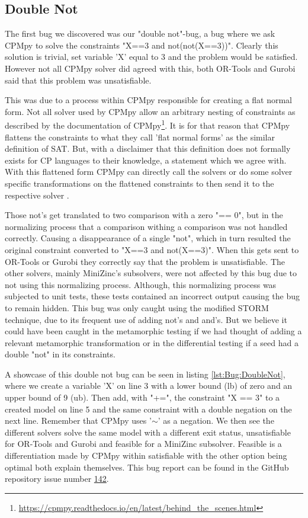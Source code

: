 \subsection{Double Not}
\label{res:bug:DoubleNot}
The first bug we discovered was our "double not"-bug, a bug where we ask CPMpy to solve the constraints "X==3 and not(not(X==3))". Clearly this solution is trivial, set variable 'X' equal to 3 and the problem would be satisfied. However not all CPMpy solver did agreed with this, both OR-Tools and Gurobi said that this problem was unsatisfiable. 

This was due to a process within CPMpy responsible for creating a flat normal form. Not all solver used by CPMpy allow an arbitrary nesting of constraints as described by the documentation of CPMpy\footnote{\url{https://cpmpy.readthedocs.io/en/latest/behind_the_scenes.html}}. It is for that reason that CPMpy flattens the constraints to what they call 'flat normal forms' as the similar definition of SAT. But, with a disclaimer that this definition does not formally exists for CP languages to their knowledge, a statement which we agree with. With this flattened form CPMpy can directly call the solvers or do some solver specific transformations on the flattened constraints to then send it to the respective solver \cite{CPMpyGithub}. 

Those not's get translated to two comparison with a zero "== 0", but in the normalizing process that a comparison withing a comparison was not handled correctly. Causing a disappearance of a single "not", which in turn resulted the original constraint converted to "X==3 and not(X==3)". When this gets sent to OR-Tools or Gurobi they correctly say that the problem is unsatisfiable. The other solvers, mainly MiniZinc's subsolvers, were not affected by this bug due to not using this normalizing process. Although, this normalizing process was subjected to unit tests, these tests contained an incorrect output causing the bug to remain hidden. This bug was only caught using the modified STORM technique, due to its frequent use of adding not's and and's. But we believe it could have been caught in the metamorphic testing if we had thought of adding a relevant metamorphic transformation or in the differential testing if a seed had a double "not" in its constraints. 

A showcase of this double not bug can be seen in listing \ref{lst:Bug:DoubleNot}, where we create a variable 'X' on line 3 with a lower bound (lb) of zero and an upper bound of 9 (ub). Then add, with "+=", the constraint "X == 3" to a created model on line 5 and the same constraint with a double negation on the next line. Remember that CPMpy uses '$\sim$' as a negation. We then see the different solvers solve the same model with a different exit status, unsatisfiable for OR-Tools and Gurobi and feasible for a MiniZinc subsolver. Feasible is a differentiation made by CPMpy within satisfiable with the other option being optimal both explain themselves. This bug report can be found in the GitHub repository issue number \href{https://github.com/CPMpy/cpmpy/issues/142}{142}.  

